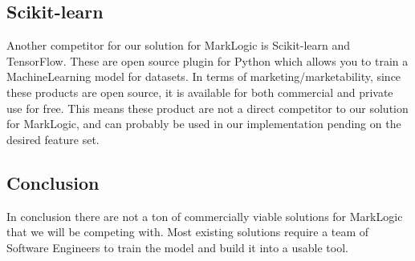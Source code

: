 \documentclass[12pt,oneside,letterpaper]{article}
\begin{document}
\subsection{Scikit-learn}
Another competitor for our solution for MarkLogic is Scikit-learn and TensorFlow. These are open source plugin for Python which allows you to train a MachineLearning model for datasets. In terms of marketing/marketability, since these products are open source, it is available for both commercial and private use for free. This means these product are not a direct competitor to our solution for MarkLogic, and can probably be used in our implementation pending on the desired feature set. 

\subsection{Conclusion}
In conclusion there are not a ton of commercially viable solutions for MarkLogic that we will be competing with. Most existing solutions require a team of Software Engineers to train the model and build it into a usable tool. 
\end{document}
